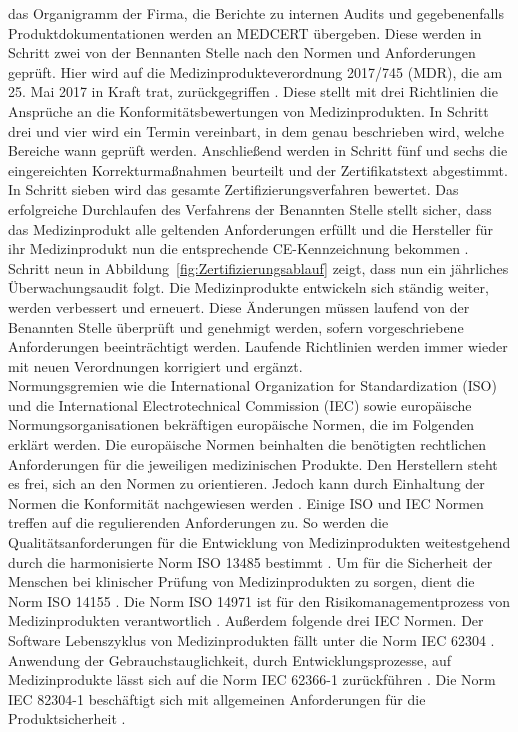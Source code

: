 das Organigramm der Firma,
die Berichte zu internen Audits und gegebenenfalls Produktdokumentationen werden an MEDCERT übergeben.
Diese werden in Schritt zwei von der Bennanten Stelle nach den Normen und Anforderungen geprüft.
Hier wird auf die Medizinprodukteverordnung 2017/745 (MDR), die am 25. Mai 2017 in Kraft trat,
zurückgegriffen \cite{Produkteverordnung}.
Diese stellt mit drei Richtlinien  die Ansprüche an die Konformitätsbewertungen von Medizinprodukten.
In Schritt drei und vier wird ein Termin vereinbart, in dem genau beschrieben wird, welche Bereiche wann geprüft werden.
Anschließend werden in Schritt fünf und sechs die eingereichten Korrekturmaßnahmen beurteilt und der Zertifikatstext abgestimmt.
In Schritt sieben wird das gesamte Zertifizierungsverfahren bewertet.
Das erfolgreiche Durchlaufen des Verfahrens der Benannten Stelle stellt sicher,
dass das Medizinprodukt alle geltenden Anforderungen erfüllt
und die Hersteller für ihr Medizinprodukt nun die entsprechende CE-Kennzeichnung bekommen \cite{AI_in_EU}.
Schritt neun in Abbildung~\ref{fig:Zertifizierungsablauf} zeigt, dass nun ein jährliches Überwachungsaudit folgt.
Die Medizinprodukte entwickeln sich ständig weiter, werden verbessert und erneuert. 
Diese Änderungen müssen laufend von der Benannten Stelle überprüft und genehmigt werden,
sofern vorgeschriebene Anforderungen beeinträchtigt werden.
Laufende Richtlinien werden immer wieder mit neuen Verordnungen korrigiert und ergänzt.\\
Normungsgremien wie die International Organization for Standardization (ISO) und die International Electrotechnical Commission (IEC) sowie europäische Normungsorganisationen bekräftigen europäische Normen, die im Folgenden erklärt werden. 
Die europäische Normen beinhalten die benötigten rechtlichen Anforderungen für die jeweiligen medizinischen Produkte. Den Herstellern steht es frei, sich an den Normen zu orientieren. Jedoch kann durch Einhaltung der Normen die Konformität nachgewiesen werden \cite{AI_in_EU}.
Einige ISO und IEC Normen treffen auf die regulierenden Anforderungen zu.
So werden die Qualitätsanforderungen für die Entwicklung von Medizinprodukten weitestgehend durch die harmonisierte Norm ISO 13485 bestimmt \cite{iso13485}. 
Um für die Sicherheit der Menschen bei klinischer Prüfung von Medizinprodukten zu sorgen, dient die Norm ISO 14155  \cite{iso14155}.
Die Norm ISO 14971 ist für den Risikomanagementprozess von Medizinprodukten verantwortlich \cite{iso14971}.
Außerdem folgende drei IEC Normen.
Der Software Lebenszyklus von Medizinprodukten fällt unter die Norm IEC 62304 \cite{iec62304}. 
Anwendung der Gebrauchstauglichkeit, durch Entwicklungsprozesse,
auf Medizinprodukte lässt sich auf die Norm IEC 62366-1 zurückführen \cite{iec623661}. 
Die Norm IEC 82304-1 beschäftigt sich mit allgemeinen Anforderungen für die Produktsicherheit \cite{iec823041}.